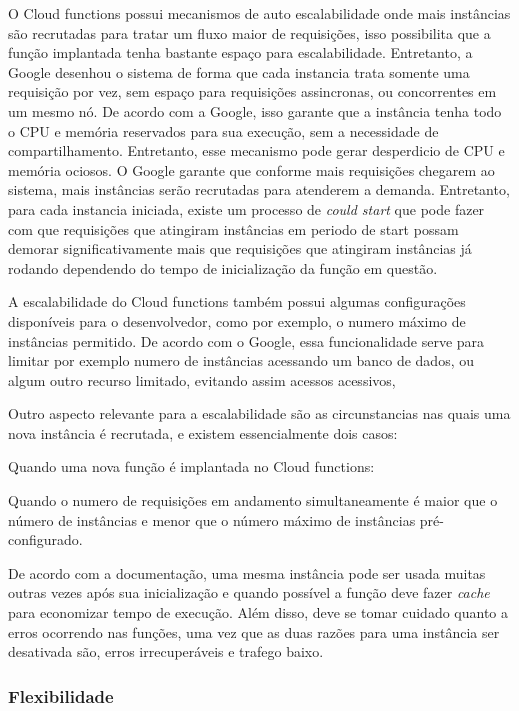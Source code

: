 O Cloud functions possui mecanismos de auto escalabilidade onde mais instâncias
são recrutadas para tratar um fluxo maior de requisições, isso possibilita que
a função implantada tenha bastante espaço para escalabilidade. Entretanto, a
Google desenhou o sistema de forma que cada instancia trata somente uma
requisição por vez, sem espaço para requisições assincronas, ou concorrentes em
um mesmo nó. De acordo com a Google, isso garante que a instância tenha todo o
CPU e memória reservados para sua execução, sem a necessidade de
compartilhamento. Entretanto, esse mecanismo pode gerar desperdicio de CPU e
memória ociosos. O Google garante que conforme mais requisições chegarem ao
sistema, mais instâncias serão recrutadas para atenderem a demanda. Entretanto,
para cada instancia iniciada, existe um processo de \textit{could start} que
pode fazer com que requisições que atingiram instâncias em periodo de start
possam demorar significativamente mais que requisições que atingiram instâncias
já rodando dependendo do tempo de inicialização da função em questão.

\bigskip
A escalabilidade do Cloud functions também possui algumas configurações
disponíveis para o desenvolvedor, como por exemplo, o numero máximo de
instâncias permitido. De acordo com o Google, essa funcionalidade serve para
limitar por exemplo numero de instâncias acessando um banco de dados, ou algum
outro recurso limitado, evitando assim acessos acessivos,

\bigskip
Outro aspecto relevante para a escalabilidade são as circunstancias nas quais
uma nova instância é recrutada, e existem essencialmente dois casos:
\begin{alineas}
	\item Quando uma nova função é implantada no Cloud functions:
	\item Quando o numero de requisições em andamento simultaneamente é
	maior que o número de instâncias e menor que o número máximo de
	instâncias
	pré-configurado.
\end{alineas}

\bigskip
De acordo com a documentação, uma mesma instância pode ser usada muitas outras
vezes após sua inicialização e quando possível a função deve fazer
\textit{cache} para economizar tempo de execução. Além disso, deve se tomar
cuidado quanto a erros ocorrendo nas funções, uma vez que as duas razões para
uma instância ser desativada são, erros irrecuperáveis e trafego baixo.

\subsubsection{Flexibilidade}

